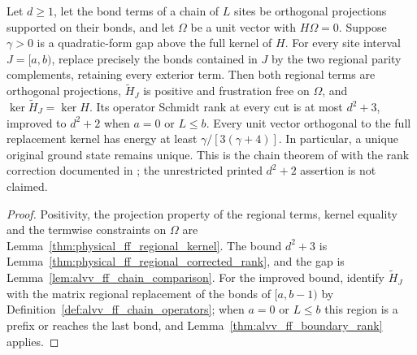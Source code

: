 \begin{theorem}
    \label{thm:alvv_ff_chain_replacement}
    \leanok
    Let $d\ge1$, let the bond terms of a chain of $L$ sites be orthogonal
    projections supported on their bonds, and let $\Omega$ be a unit
    vector with $H\Omega=0$.
    Suppose $\gamma>0$ is a quadratic-form gap above the full kernel
    of $H$. For every site interval $J=\lbrack a,b)$, replace precisely
    the bonds contained in $J$ by the two regional parity complements,
    retaining every exterior term. Then both regional terms are orthogonal
    projections, $\widetilde H_J$ is positive and frustration free on
    $\Omega$, and $\ker\widetilde H_J=\ker H$.
    Its operator Schmidt rank at every cut is at most $d^2+3$,
    improved to $d^2+2$ when $a=0$ or $L\le b$.
    Every unit vector orthogonal to the full replacement kernel has
    energy at least $\gamma/[3(\gamma+4)]$.
    In particular, a unique original ground state remains unique.
    This is the chain theorem of
    \cite[Theorem~5.14]{Arad2016RigorousRG} with the rank correction
    documented in \cite{gap:alvv16_ff_rank}; the unrestricted printed
    $d^2+2$ assertion is not claimed.
\end{theorem}
\begin{proof}\leanok
    Positivity, the projection property of the regional terms, kernel
    equality and the termwise constraints on $\Omega$ are
    Lemma~\ref{thm:physical_ff_regional_kernel}. The bound $d^2+3$ is
    Lemma~\ref{thm:physical_ff_regional_corrected_rank}, and the gap is
    Lemma~\ref{lem:alvv_ff_chain_comparison}. For the improved bound,
    identify $\widetilde H_J$ with the matrix regional replacement of the
    bonds of $\lbrack a,b-1)$ by
    Definition~\ref{def:alvv_ff_chain_operators}; when $a=0$ or $L\le b$
    this region is a prefix or reaches the last bond, and
    Lemma~\ref{thm:alvv_ff_boundary_rank} applies.
\end{proof}
